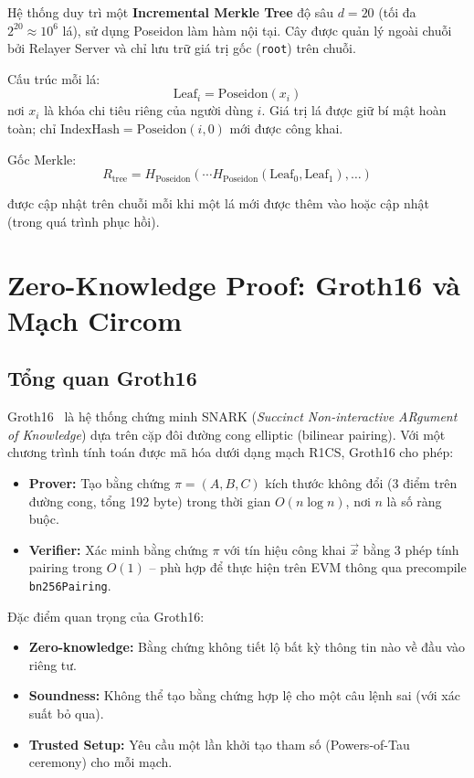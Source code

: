\documentclass[../DoAn.tex]{subfiles}
\begin{document}
Hệ thống duy trì một \textbf{Incremental Merkle Tree} độ sâu \(d = 20\) (tối đa \(2^{20} \approx 10^6\) lá), sử dụng Poseidon làm hàm nội tại. Cây được quản lý ngoài chuỗi bởi Relayer Server và chỉ lưu trữ giá trị gốc (\texttt{root}) trên chuỗi.

Cấu trúc mỗi lá:
\[
    \text{Leaf}_i = \text{Poseidon}(x_i)
\]
nơi \(x_i\) là khóa chi tiêu riêng của người dùng \(i\). Giá trị lá được giữ bí mật hoàn toàn; chỉ \(\text{IndexHash} = \text{Poseidon}(i, 0)\) mới được công khai.

Gốc Merkle:
\[
    R_{\text{tree}} = H_{\text{Poseidon}}(\cdots H_{\text{Poseidon}}(\text{Leaf}_0, \text{Leaf}_1), \ldots)
\]

được cập nhật trên chuỗi mỗi khi một lá mới được thêm vào hoặc cập nhật (trong quá trình phục hồi).

\section{Zero-Knowledge Proof: Groth16 và Mạch Circom}

\subsection{Tổng quan Groth16}
\label{subsec:groth16}

Groth16~\cite{groth16} là hệ thống chứng minh SNARK (\textit{Succinct Non-interactive ARgument of Knowledge}) dựa trên cặp đôi đường cong elliptic (bilinear pairing). Với một chương trình tính toán được mã hóa dưới dạng mạch R1CS, Groth16 cho phép:
\begin{itemize}
    \item \textbf{Prover:} Tạo bằng chứng \(\pi = (A, B, C)\) kích thước không đổi (3 điểm trên đường cong, tổng 192 byte) trong thời gian \(O(n \log n)\), nơi \(n\) là số ràng buộc.
    \item \textbf{Verifier:} Xác minh bằng chứng \(\pi\) với tín hiệu công khai \(\vec{x}\) bằng 3 phép tính pairing trong \(O(1)\) -- phù hợp để thực hiện trên EVM thông qua precompile \texttt{bn256Pairing}.
\end{itemize}

Đặc điểm quan trọng của Groth16:
\begin{itemize}
    \item \textbf{Zero-knowledge:} Bằng chứng không tiết lộ bất kỳ thông tin nào về đầu vào riêng tư.
    \item \textbf{Soundness:} Không thể tạo bằng chứng hợp lệ cho một câu lệnh sai (với xác suất bỏ qua).
    \item \textbf{Trusted Setup:} Yêu cầu một lần khởi tạo tham số (Powers-of-Tau ceremony) cho mỗi mạch.
\end{itemize}
\end{document}
